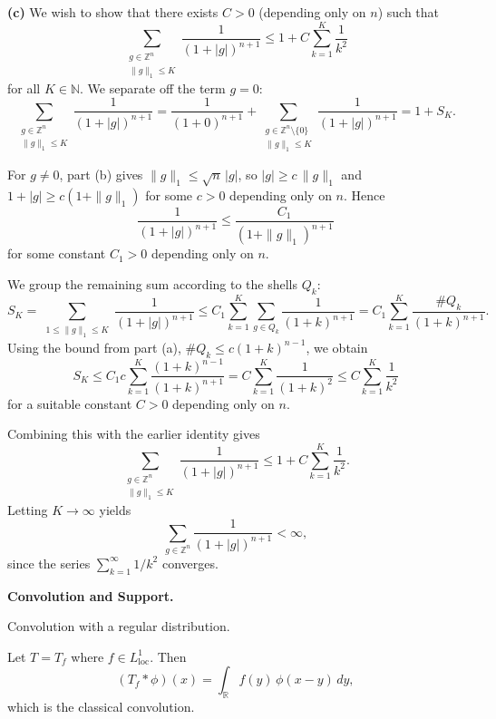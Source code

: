 \begin{solution}
\par\medskip\noindent\textbf{(c)}\quad
We wish to show that there exists $C>0$ (depending only on $n$) such
that
\[
\sum_{\substack{g\in\mathbb{Z}^n\\ \|g\|_1\le K}}
\frac{1}{(1+|g|)^{n+1}}
\le 1 + C\sum_{k=1}^K \frac{1}{k^2}
\]
for all $K\in\mathbb{N}$.  We separate off the term $g=0$:
\[
\sum_{\substack{g\in\mathbb{Z}^n\\ \|g\|_1\le K}}
\frac{1}{(1+|g|)^{n+1}}
= \frac{1}{(1+0)^{n+1}}
+ \sum_{\substack{g\in\mathbb{Z}^n\setminus\{0\}\\ \|g\|_1\le K}}
\frac{1}{(1+|g|)^{n+1}}
= 1 + S_K.
\]

For $g\neq 0$, part (b) gives $\|g\|_1 \le \sqrt{n}\,|g|$, so
$|g| \ge c\,\|g\|_1$ and $1+|g| \ge c(1+\|g\|_1)$ for some $c>0$
depending only on $n$.  Hence
\[
\frac{1}{(1+|g|)^{n+1}}
\le \frac{C_1}{(1+\|g\|_1)^{n+1}}
\]
for some constant $C_1>0$ depending only on $n$.

We group the remaining sum according to the shells $Q_k$:
\[
S_K
= \sum_{\substack{1\le\|g\|_1\le K}}
\frac{1}{(1+|g|)^{n+1}}
\le C_1 \sum_{k=1}^K \sum_{g\in Q_k}
\frac{1}{(1+k)^{n+1}}
= C_1 \sum_{k=1}^K \frac{\#Q_k}{(1+k)^{n+1}}.
\]
Using the bound from part (a), $\#Q_k\le c(1+k)^{n-1}$, we obtain
\[
S_K
\le C_1 c \sum_{k=1}^K \frac{(1+k)^{n-1}}{(1+k)^{n+1}}
= C \sum_{k=1}^K \frac{1}{(1+k)^2}
\le C \sum_{k=1}^K \frac{1}{k^2}
\]
for a suitable constant $C>0$ depending only on $n$.

Combining this with the earlier identity gives
\[
\sum_{\substack{g\in\mathbb{Z}^n\\ \|g\|_1\le K}}
\frac{1}{(1+|g|)^{n+1}}
\le 1 + C\sum_{k=1}^K \frac{1}{k^2}.
\]
Letting $K\to\infty$ yields
\[
\sum_{g\in\mathbb{Z}^n} \frac{1}{(1+|g|)^{n+1}} < \infty,
\]
since the series $\sum_{k=1}^\infty 1/k^2$ converges.
\end{solution}

\begin{problem}[CP-II-0360]
\label{prob:cp-ii-0360}
\textbf{Convolution and Support.}

\hspace*{1.5em}Convolution with a regular distribution.

Let $T=T_f$ where $f\in L^1_{\mathrm{loc}}$. Then
\[
(T_f*\phi)(x)
= \int_{\mathbb{R}} f(y)\,\phi(x-y)\,dy,
\]
which is the classical convolution.
\end{problem}

